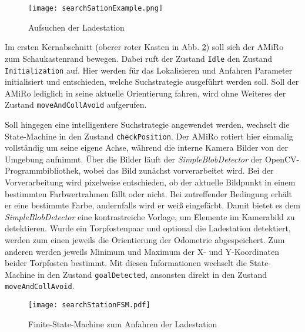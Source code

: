 \begin{figure}[H]
	\begin{center}
		\texttt{[image: searchSationExample.png]} 	
		\caption{Aufsuchen der Ladestation}
		\label{fig:searchStationExample}
	\end{center}
\end{figure}

Im ersten Kernabschnitt (oberer roter Kasten in Abb. \ref{fig:searchStationFSM}) soll sich der AMiRo zum Schaukastenrand bewegen. Dabei ruft der Zustand \texttt{Idle} den Zustand \texttt{Initialization} auf. Hier werden für das Lokalisieren und Anfahren Parameter initialisiert und entschieden, welche Suchstrategie ausgeführt werden soll. Soll der AMiRo lediglich in seine aktuelle Orientierung fahren, wird ohne Weiteres der Zustand \texttt{moveAndCollAvoid} aufgerufen. 

Soll hingegen eine intelligentere Suchstrategie angewendet werden, wechselt die State-Machine in den Zustand \texttt{checkPosition}. Der AMiRo rotiert hier einmalig vollständig um seine eigene Achse, während die interne Kamera Bilder von der Umgebung aufnimmt. Über die Bilder läuft der \textit{SimpleBlobDetector} der OpenCV-Programmbibliothek, wobei das Bild zunächst vorverarbeitet wird. Bei der Vorverarbeitung wird pixelweise entschieden, ob der aktuelle Bildpunkt in einem bestimmten Farbwertrahmen fällt oder nicht. Bei zutreffender Bedingung erhält er eine bestimmte Farbe, andernfalls wird er weiß eingefärbt. Damit bietet es dem \textit{SimpleBlobDetector} eine kontrastreiche Vorlage, um Elemente im Kamerabild zu detektieren. Wurde ein Torpfostenpaar und optional die Ladestation detektiert, werden zum einen jeweils die Orientierung der Odometrie abgespeichert. Zum anderen werden jeweils Minimum und Maximum der X- und Y-Koordinaten beider Torpfosten bestimmt. Mit diesen Informationen wechselt die State-Machine in den Zustand \texttt{goalDetected}, ansonsten direkt in den Zustand \texttt{moveAndCollAvoid}.

\begin{figure}[H]
	\begin{center}
		\texttt{[image: searchStationFSM.pdf]} 	
		\caption{Finite-State-Machine zum Anfahren der Ladestation}
		\label{fig:searchStationFSM}
	\end{center}
\end{figure}

